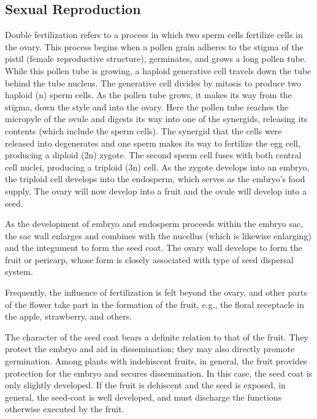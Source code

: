 \documentclass[]{book}
\theoremstyle{definition}
\theoremstyle{definition}
\theoremstyle{definition}
\theoremstyle{remark}
\begin{document}
\subsection{Sexual Reproduction}\label{sexual-reproduction}

Double fertilization refers to a process in which two sperm cells
fertilize cells in the ovary. This process begins when a pollen grain
adheres to the stigma of the pistil (female reproductive structure),
germinates, and grows a long pollen tube. While this pollen tube is
growing, a haploid generative cell travels down the tube behind the tube
nucleus. The generative cell divides by mitosis to produce two haploid
(n) sperm cells. As the pollen tube grows, it makes its way from the
stigma, down the style and into the ovary. Here the pollen tube reaches
the micropyle of the ovule and digests its way into one of the
synergids, releasing its contents (which include the sperm cells). The
synergid that the cells were released into degenerates and one sperm
makes its way to fertilize the egg cell, producing a diploid (2n)
zygote. The second sperm cell fuses with both central cell nuclei,
producing a triploid (3n) cell. As the zygote develops into an embryo,
the triploid cell develops into the endosperm, which serves as the
embryo's food supply. The ovary will now develop into a fruit and the
ovule will develop into a seed.

As the development of embryo and endosperm proceeds within the embryo
sac, the sac wall enlarges and combines with the nucellus (which is
likewise enlarging) and the integument to form the seed coat. The ovary
wall develops to form the fruit or pericarp, whose form is closely
associated with type of seed dispersal system.

Frequently, the influence of fertilization is felt beyond the ovary, and
other parts of the flower take part in the formation of the fruit, e.g.,
the floral receptacle in the apple, strawberry, and others.

The character of the seed coat bears a definite relation to that of the
fruit. They protect the embryo and aid in dissemination; they may also
directly promote germination. Among plants with indehiscent fruits, in
general, the fruit provides protection for the embryo and secures
dissemination. In this case, the seed coat is only slightly developed.
If the fruit is dehiscent and the seed is exposed, in general, the
seed-coat is well developed, and must discharge the functions otherwise
executed by the fruit.
\end{document}
